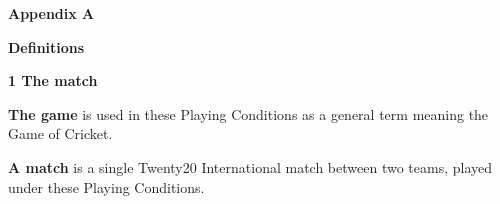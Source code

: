 \documentclass[12pt]{article}
\begin{document}
\vspace{\baselineskip}

\vspace{\baselineskip}

\vspace{\baselineskip}

\vspace{\baselineskip}

\vspace{\baselineskip}

\vspace{\baselineskip}

\vspace{\baselineskip}
\begin{Center}
{\fontsize{8pt}{9.6pt}\par}
\end{Center}\par


\vspace{\baselineskip}
\begin{Center}
{\fontsize{11pt}{13.2pt}\selectfont \textbf{Appendix A}\par}
\end{Center}\par


\vspace{\baselineskip}
\begin{Center}
{\fontsize{11pt}{13.2pt}\selectfont \textbf{Definitions}\par}
\end{Center}\par


\vspace{\baselineskip}
{\fontsize{16pt}{19.2pt}\selectfont \textbf{1 \tabto{0.47in} The match}\par}\par


\vspace{\baselineskip}
{\fontsize{9pt}{10.8pt} \tabto{0.39in} {\fontsize{8pt}{9.6pt}\selectfont \textbf{The game }is used in these Playing Conditions as a general term meaning the Game of Cricket.\par}\par}\par


\vspace{\baselineskip}
\begin{adjustwidth}{0.4in}{0.65in}
{\fontsize{9pt}{10.8pt} \tabto{0.39in} \textbf{A match }is a single Twenty20 International match between two teams, played under these Playing\textbf{ }Conditions.\par}\par

\end{adjustwidth}
\end{document}
